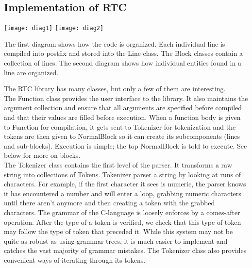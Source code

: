 \documentclass{article}
\begin{document}
\subsection{Implementation of RTC}

\begin{center}
\texttt{[image: diag1]}
\texttt{[image: diag2]}
\end{center}

\noindent
The first diagram shows how the code is organized. Each individual line is
compiled into postfix and stored into the Line class. The Block classes
contain a collection of lines. The second diagram shows how individual
entities found in a line are organized.

\noindent
The RTC library has many classes, but only a few of them are interesting.\\

\noindent
The Function class provides the user interface to the library. It also 
maintains the argument collection and ensure that all arguments are specified 
before compiled and that their values are filled before execution. When a 
function body is given to Function for compilation, it gets sent to 
Tokenizer for tokenization and the tokens are then given to NormalBlock so
it can create its subcomponents (lines and sub-blocks). Execution is simple;
the top NormalBlock is told to execute. See below for more on blocks.\\

\noindent
The Tokenizer class contains the first level of the parser. It transforms
a raw string into collections of Tokens. Tokenizer parser a string by looking
at runs of characters. For example, if the first character it sees is numeric,
the parser knows it has encountered a number and will enter a loop, grabbing
numeric characters until there aren't anymore and then creating a token with
the grabbed characters. The grammar of the C-language is loosely enforces by
a comes-after operation. After the type of a token is verified, we check that
this type of token may follow the type of token that preceded it. While this
system may not be quite as robust as using grammar trees, it is much easier
to implement and catches the vast majority of grammar mistakes. The Tokenizer
class also provides convenient ways of iterating through its tokens. \\
\end{document}
